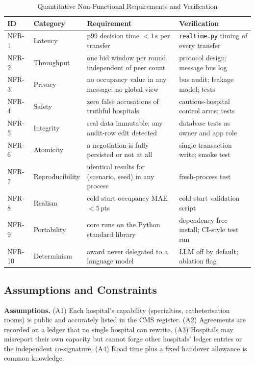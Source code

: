 \begin{table}[!t]
\centering
\caption{Quantitative Non-Functional Requirements and Verification}
\label{tab:nfr}
\scriptsize
\setlength{\tabcolsep}{2.2pt}
\begin{tabular}{@{}p{0.8cm}p{1.55cm}p{2.5cm}p{2.5cm}@{}}
\toprule
ID & Category & Requirement & Verification \\
\midrule
NFR-1 & Latency & p99 decision time $<1$\,s per transfer & \texttt{realtime.py} timing of every transfer \\
NFR-2 & Throughput & one bid window per round, independent of peer count & protocol design; message bus log \\
NFR-3 & Privacy & no occupancy value in any message; no global view & bus audit; leakage model; tests \\
NFR-4 & Safety & zero false accusations of truthful hospitals & cautious-hospital control arms; tests \\
NFR-5 & Integrity & real data immutable; any audit-row edit detected & database tests as owner and app role \\
NFR-6 & Atomicity & a negotiation is fully persisted or not at all & single-transaction write; smoke test \\
NFR-7 & Reproducibility & identical results for (scenario, seed) in any process & fresh-process test \\
NFR-8 & Realism & cold-start occupancy MAE $<5$\,pts & cold-start validation script \\
NFR-9 & Portability & core runs on the Python standard library & dependency-free install; CI-style test run \\
NFR-10 & Determinism & award never delegated to a language model & LLM off by default; ablation flag \\
\bottomrule
\end{tabular}
\end{table}

\subsection{Assumptions and Constraints}
\textbf{Assumptions.} (A1) Each hospital's capability (specialties, catheterisation rooms) is public and accurately listed in the CMS register. (A2) Agreements are recorded on a ledger that no single hospital can rewrite. (A3) Hospitals may misreport their own capacity but cannot forge other hospitals' ledger entries or the independent co-signature. (A4) Road time plus a fixed handover allowance is common knowledge.

